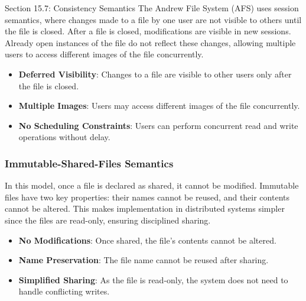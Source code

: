 \begin{notes}{Section 15.7: Consistency Semantics}
    The Andrew File System (AFS) uses session semantics, where changes made to a file by one user are not visible to others until the file is closed. After a file is closed, modifications are visible in 
    new sessions. Already open instances of the file do not reflect these changes, allowing multiple users to access different images of the file concurrently.
    
    \begin{highlight}
    
        \begin{itemize}
            \item \textbf{Deferred Visibility}: Changes to a file are visible to other users only after the file is closed.
            \item \textbf{Multiple Images}: Users may access different images of the file concurrently.
            \item \textbf{No Scheduling Constraints}: Users can perform concurrent read and write operations without delay.
        \end{itemize}
    
    \end{highlight}
    
    \subsubsection*{Immutable-Shared-Files Semantics}
    
    In this model, once a file is declared as shared, it cannot be modified. Immutable files have two key properties: their names cannot be reused, and their contents cannot be altered. This makes 
    implementation in distributed systems simpler since the files are read-only, ensuring disciplined sharing.
    
    \begin{highlight}
    
        \begin{itemize}
            \item \textbf{No Modifications}: Once shared, the file's contents cannot be altered.
            \item \textbf{Name Preservation}: The file name cannot be reused after sharing.
            \item \textbf{Simplified Sharing}: As the file is read-only, the system does not need to handle conflicting writes.
        \end{itemize}
    

\end{highlight}
\end{notes}
